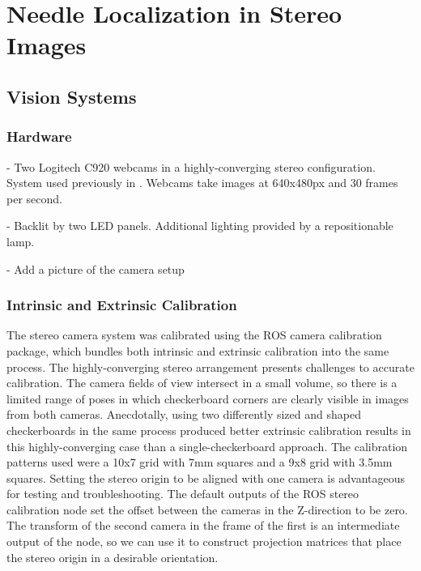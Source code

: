 %
%
%



\chapter{Needle Localization in Stereo Images}
\label{stereotracking} %

\section{Vision Systems}
\subsection{Hardware}
- Two Logitech C920 webcams in a highly-converging stereo configuration. System used previously in \cite{wartenberg_closed-loop_2017}. Webcams take images at 640x480px and 30 frames per second.

- Backlit by two LED panels. Additional lighting provided by a repositionable lamp.

- Add a picture of the camera setup

\subsection{Intrinsic and Extrinsic Calibration}
	The stereo camera system was calibrated using the ROS camera calibration package, which bundles both intrinsic and extrinsic calibration into the same process. The highly-converging stereo arrangement presents challenges to accurate calibration. The camera fields of view intersect in a small volume, so there is a limited range of poses in which checkerboard corners are clearly visible in images from both cameras. Anecdotally, using two differently sized and shaped checkerboards in the same process produced better extrinsic calibration results in this highly-converging case than a single-checkerboard approach. The calibration patterns used were a 10x7 grid with 7mm squares and a 9x8 grid with 3.5mm squares. 
	Setting the stereo origin to be aligned with one camera is advantageous for testing and troubleshooting. The default outputs of the ROS stereo calibration node set the offset between the cameras in the Z-direction to be zero. The transform of the second camera in the frame of the first is an intermediate output of the node, so we can use it to construct projection matrices that place the stereo origin in a desirable orientation.
    
